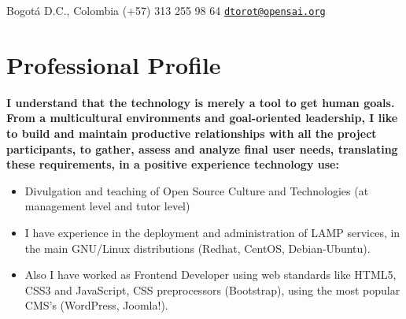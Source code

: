 \documentclass[overlapped,line,final]{res}
\begin{document}

\begin{resume}


	\begin{minipage}{0.5\linewidth}
    		Bogotá D.C., Colombia \newline
    		(+57) 313 255 98 64 \newline
		{\tt \href{mailto:dtorot@opensai.org}{dtorot@opensai.org}}
	\end{minipage}


\vspace{0.5cm}
\section{\sc Professional Profile}
\vspace{0.5cm}

	\textbf {I understand that the technology is merely a tool to get human goals. From a multicultural environments and goal-oriented leadership, I like to build and maintain productive relationships with all the project participants, to gather, assess and analyze final user needs, translating these requirements, in a positive experience technology use:}

\vspace{2mm}
\begin{itemize} 
	\item Divulgation and teaching of Open Source Culture and Technologies (at management level and tutor level)
	\item I have experience in the deployment and administration of LAMP services, in the main GNU/Linux distributions (Redhat, CentOS, Debian-Ubuntu). 
	\item Also I have worked as Frontend Developer using web standards like HTML5, CSS3 and JavaScript, CSS preprocessors (Bootstrap), using the most popular CMS's (WordPress, Joomla!).


\end{itemize}
\end{resume}
\end{document}
